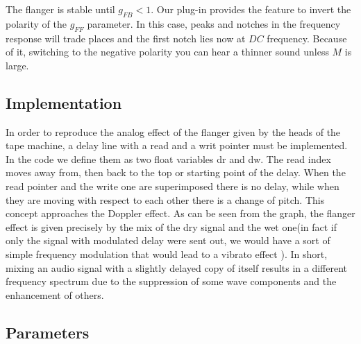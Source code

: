 The flanger is stable until $g_{FB} < 1$. 
Our plug-in provides the feature to invert the polarity of the $g_{FF}$ parameter. In this case, peaks and notches in the frequency response will trade places and the first notch lies now at $DC$ frequency. Because of it, switching to the negative polarity you can hear a thinner sound unless $M$ is large.

\subsection{Implementation}\label{sec:implementation}

In order to reproduce the analog effect of the flanger given by the heads of the tape machine, a delay line with a read and a writ pointer must be implemented. In the code we define them as two float variables dr and dw. The read index moves away from, then back to the top or starting point of the delay. When the read pointer and the write one are superimposed there is no delay, while when they are moving with respect to each other there is a change of pitch. This concept approaches the Doppler effect. As can be seen from the graph, the flanger effect is given precisely by the mix of the dry signal and the wet one(in fact if only the signal with modulated delay were sent out, we would have a sort of simple frequency modulation that would lead to a vibrato effect ). In short, mixing an audio signal with a slightly delayed copy of itself results in a different frequency spectrum due to the suppression of some wave components and the enhancement of others.\par

\subsection{Parameters}\label{sec:Parameters}


